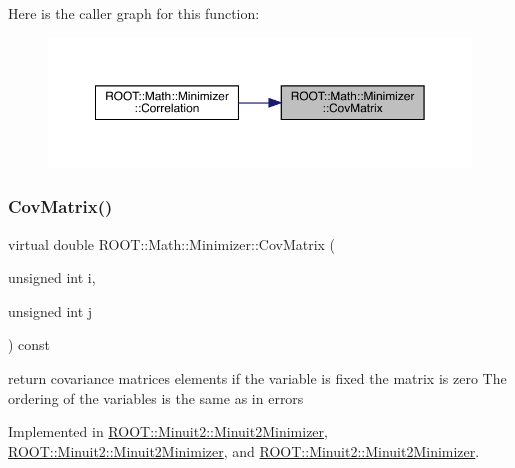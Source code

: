 Here is the caller graph for this function\+:
\nopagebreak
\begin{figure}[H]
\begin{center}
\leavevmode
\includegraphics[width=350pt]{dc/dc4/classROOT_1_1Math_1_1Minimizer_a01b0ec371972dab12ca3b9c962d952f8_icgraph}
\end{center}
\end{figure}
\mbox{\label{classROOT_1_1Math_1_1Minimizer_a01b0ec371972dab12ca3b9c962d952f8}} 
\subsubsection{\texorpdfstring{CovMatrix()}{CovMatrix()}\hspace{0.1cm}{\footnotesize\ttfamily [2/3]}}
{\footnotesize\ttfamily virtual double R\+O\+O\+T\+::\+Math\+::\+Minimizer\+::\+Cov\+Matrix (\begin{DoxyParamCaption}\item[{unsigned int}]{i,  }\item[{unsigned int}]{j }\end{DoxyParamCaption}) const\hspace{0.3cm}{\ttfamily [pure virtual]}}

return covariance matrices elements if the variable is fixed the matrix is zero The ordering of the variables is the same as in errors 

Implemented in \mbox{\hyperlink{classROOT_1_1Minuit2_1_1Minuit2Minimizer_a6ba10de01ab6e7228fa4908894de5619}{R\+O\+O\+T\+::\+Minuit2\+::\+Minuit2\+Minimizer}}, \mbox{\hyperlink{classROOT_1_1Minuit2_1_1Minuit2Minimizer_a6ba10de01ab6e7228fa4908894de5619}{R\+O\+O\+T\+::\+Minuit2\+::\+Minuit2\+Minimizer}}, and \mbox{\hyperlink{classROOT_1_1Minuit2_1_1Minuit2Minimizer_a6ba10de01ab6e7228fa4908894de5619}{R\+O\+O\+T\+::\+Minuit2\+::\+Minuit2\+Minimizer}}.

\mbox{\label{classROOT_1_1Math_1_1Minimizer_a01b0ec371972dab12ca3b9c962d952f8}} 
